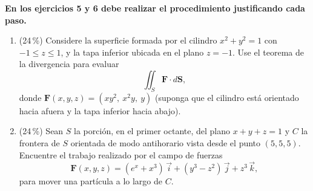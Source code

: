 \documentclass[11pt]{article}
\begin{document}
\vspace{4pt}
\noindent\textbf{En los ejercicios 5 y 6 debe realizar el procedimiento justificando cada paso.}

\begin{enumerate}[start=5]
\item{} (24\,\%) Considere la superficie formada por el cilindro $x^2 + y^2 = 1$ con $-1 \leq z \leq 1$, y la tapa inferior ubicada en el plano $z = -1$. Use el teorema de la divergencia para evaluar
\[
\iint_S \mathbf F \cdot d\mathbf S,
\]
donde $\mathbf F(x,y,z) = (xy^2,\ x^2y,\ y)$ (suponga que el cilindro está orientado hacia afuera y la tapa inferior hacia abajo).

\item{} (24\,\%) Sean $S$ la porción, en el primer octante, del plano $x + y + z = 1$ y $C$ la frontera de $S$ orientada de modo antihorario vista desde el punto $(5,5,5)$. Encuentre el trabajo realizado por el campo de fuerzas
\[
\mathbf F(x,y,z) = (e^x + x^3)\,\vec i + (y^3 - z^2)\,\vec j + z^3\,\vec k,
\]
para mover una partícula a lo largo de $C$.
\end{enumerate}

\examfooter
\end{document}
